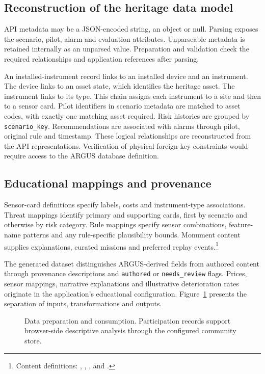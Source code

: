 \documentclass[10pt,a4paper]{article}
\begin{document}
\subsection{Reconstruction of the heritage data model}
API metadata may be a JSON-encoded string, an object or null. Parsing exposes the scenario, pilot, alarm and evaluation attributes. Unparseable metadata is retained internally as an unparsed value. Preparation and validation check the required relationships and application references after parsing.

An installed-instrument record links to an installed device and an instrument. The device links to an asset state, which identifies the heritage asset. The instrument links to its type. This chain assigns each instrument to a site and then to a sensor card. Pilot identifiers in scenario metadata are matched to asset codes, with exactly one matching asset required. Risk histories are grouped by \texttt{scenario\_key}. Recommendations are associated with alarms through pilot, original rule and timestamp. These logical relationships are reconstructed from the API representations. Verification of physical foreign-key constraints would require access to the ARGUS database definition.

\subsection{Educational mappings and provenance}
Sensor-card definitions specify labels, costs and instrument-type associations. Threat mappings identify primary and supporting cards, first by scenario and otherwise by risk category. Rule mappings specify sensor combinations, feature-name patterns and any rule-specific plausibility bounds. Monument content supplies explanations, curated missions and preferred replay events.\footnote{Content definitions: , , ,  and .}

The generated dataset distinguishes ARGUS-derived fields from authored content through provenance descriptions and \texttt{authored} or \texttt{needs\_review} flags. Prices, sensor mappings, narrative explanations and illustrative deterioration rates originate in the application's educational configuration. Figure~\ref{fig:pipeline} presents the separation of inputs, transformations and outputs.
\begin{figure}[htbp]
\centering
\caption{Data preparation and consumption. Participation records support browser-side descriptive analysis through the configured community store.}\label{fig:pipeline}
\end{figure}
\end{document}

